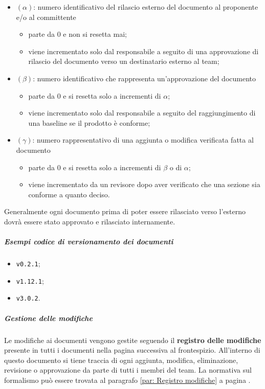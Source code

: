 		\begin{itemize}
			\item \((\alpha)\): numero identificativo del rilascio esterno del documento al proponente e/o al committente
				\begin{itemize}
					\item parte da 0 e non si resetta mai;
					\item viene incrementato solo dal responsabile a seguito di una approvazione di rilascio del documento verso un destinatario esterno al team;
				\end{itemize}
			\item \((\beta)\): numero identificativo che rappresenta un'approvazione del documento
				\begin{itemize}
					\item parte da 0 e si resetta solo a incrementi di \(\alpha\);
					\item viene incrementato solo dal responsabile a seguito del raggiungimento di una baseline se il prodotto è conforme;
				\end{itemize}
			\item \((\gamma)\): numero rappresentativo di una aggiunta o modifica verificata fatta al documento
				\begin{itemize}
					\item parte da 0 e si resetta solo a incrementi di \(\beta\) o di \(\alpha\);
					\item viene incrementato da un revisore dopo aver verificato che una sezione sia conforme a quanto deciso.
				\end{itemize}
		\end{itemize}

		Generalmente ogni documento prima di poter essere rilasciato verso l'esterno dovrà essere stato approvato e rilasciato internamente.

		\subparagraph{Esempi codice di versionamento dei documenti}

		\begin{itemize}
			\item \verb!v0.2.1!;
			\item \verb!v1.12.1!;
			\item \verb!v3.0.2!.
		\end{itemize}

		\subparagraph{Gestione delle modifiche}

		Le modifiche ai documenti vengono gestite seguendo il \textbf{registro delle modifiche} presente in tutti i documenti nella pagina successiva al frontespizio. All'interno di questo documento si tiene traccia di ogni aggiunta, modifica, eliminazione, revisione o approvazione da parte di tutti i membri del team. La normativa sul formalismo può essere trovata al paragrafo \ref{par: Registro modifiche} a pagina \pageref{par: Registro modifiche}.

